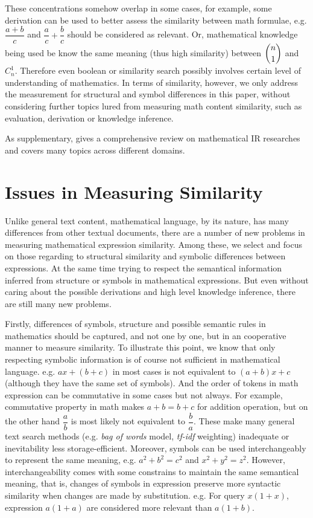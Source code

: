 These concentrations somehow overlap in some cases, for example, some derivation can be used to better assess the similarity between math formulae, e.g. $\dfrac{a + b}{c}$ and $\dfrac{a}{c} + \dfrac{b}{c}$ should be considered as relevant.
Or, mathematical knowledge being used be know the same meaning (thus high similarity) between $ \dbinom n 1 $ and $C_n^1$.
Therefore even boolean or similarity search possibly involves certain level of understanding of mathematics. In terms of similarity, however, we only address the measurement for structural and symbol differences in this paper, without considering further topics lured from measuring math content similarity, such as evaluation, derivation or knowledge inference.

As supplementary, \cite{goodsurvey} gives a comprehensive review on mathematical IR researches and covers many topics across different domains.

\section{Issues in Measuring Similarity}
\label{measure_sim}
Unlike general text content, mathematical language, by its nature, has many differences from other textual documents, there are a number of new problems in measuring mathematical expression similarity. 
Among these, we select and focus on those regarding to structural similarity and symbolic differences between expressions. 
At the same time trying to respect the semantical information inferred from structure or symbols in mathematical expressions.
But even without caring about the possible derivations and high level knowledge inference, there are still many new problems.

Firstly, differences of symbols, structure and possible semantic rules in mathematics should be captured, and not one by one, but in an cooperative manner to measure similarity. 
To illustrate this point, we know that only respecting symbolic information is of course not sufficient in mathematical language. e.g. $ax+(b+c)$ in most cases is not equivalent to $(a+b)x+c$ (although they have the same set of symbols).
And the order of tokens in math expression can be commutative in some cases but not always. For example, commutative property in math makes $a+b=b+c$ for addition operation, but on the other hand $\dfrac a b$ is most likely not equivalent to $\dfrac b a$.
These make many general text search methods (e.g. \textit{bag of words} model, \textit{tf-idf} weighting) inadequate or inevitability less storage-efficient.  
Moreover, symbols can be used interchangeably to represent the same meaning, e.g. $a^2+b^2=c^2$ and $x^2+y^2=z^2$. 
However, interchangeability comes with some constrains to maintain the same semantical meaning, that is, changes of symbols in expression preserve more syntactic similarity when changes are made by substitution. e.g. For query $x(1+x)$, expression $a(1+a)$ are considered more relevant than $a(1+b)$. 

